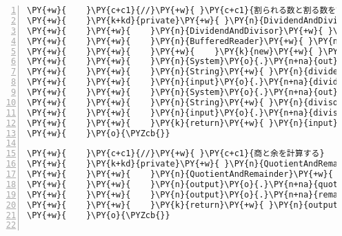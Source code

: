 \begin{Verbatim}[commandchars=\\\{\},numbers=left,firstnumber=1,stepnumber=1,frame=single,fontsize=\small]
\PY{+w}{    }\PY{c+c1}{//}\PY{+w}{ }\PY{c+c1}{割られる数と割る数を読み込む}
\PY{+w}{    }\PY{k+kd}{private}\PY{+w}{ }\PY{n}{DividendAndDivisor}\PY{+w}{ }\PY{n+nf}{input}\PY{o}{(}\PY{o}{)}\PY{+w}{ }\PY{k+kd}{throws}\PY{+w}{ }\PY{n}{IOException}\PY{+w}{ }\PY{o}{\PYZob{}}
\PY{+w}{    }\PY{+w}{    }\PY{n}{DividendAndDivisor}\PY{+w}{ }\PY{n}{input}\PY{+w}{ }\PY{o}{=}\PY{+w}{ }\PY{k}{new}\PY{+w}{ }\PY{n}{DividendAndDivisor}\PY{o}{(}\PY{o}{)}\PY{o}{;}
\PY{+w}{    }\PY{+w}{    }\PY{n}{BufferedReader}\PY{+w}{ }\PY{n}{reader}\PY{+w}{ }\PY{o}{=}
\PY{+w}{    }\PY{+w}{    }\PY{+w}{    }\PY{k}{new}\PY{+w}{ }\PY{n+nf}{BufferedReader}\PY{o}{(}\PY{k}{new}\PY{+w}{ }\PY{n}{InputStreamReader}\PY{o}{(}\PY{n}{System}\PY{o}{.}\PY{n+na}{in}\PY{o}{)}\PY{o}{)}\PY{o}{;}
\PY{+w}{    }\PY{+w}{    }\PY{n}{System}\PY{o}{.}\PY{n+na}{out}\PY{o}{.}\PY{n+na}{print}\PY{o}{(}\PY{l+s}{"割られる数を入力してください："}\PY{o}{)}\PY{o}{;}
\PY{+w}{    }\PY{+w}{    }\PY{n}{String}\PY{+w}{ }\PY{n}{dividendString}\PY{+w}{ }\PY{o}{=}\PY{+w}{ }\PY{n}{reader}\PY{o}{.}\PY{n+na}{readLine}\PY{o}{(}\PY{o}{)}\PY{o}{;}
\PY{+w}{    }\PY{+w}{    }\PY{n}{input}\PY{o}{.}\PY{n+na}{dividend}\PY{+w}{ }\PY{o}{=}\PY{+w}{ }\PY{n}{Integer}\PY{o}{.}\PY{n+na}{parseInt}\PY{o}{(}\PY{n}{dividendString}\PY{o}{)}\PY{o}{;}
\PY{+w}{    }\PY{+w}{    }\PY{n}{System}\PY{o}{.}\PY{n+na}{out}\PY{o}{.}\PY{n+na}{print}\PY{o}{(}\PY{l+s}{"割る数を入力してください："}\PY{o}{)}\PY{o}{;}
\PY{+w}{    }\PY{+w}{    }\PY{n}{String}\PY{+w}{ }\PY{n}{divisorString}\PY{+w}{ }\PY{o}{=}\PY{+w}{ }\PY{n}{reader}\PY{o}{.}\PY{n+na}{readLine}\PY{o}{(}\PY{o}{)}\PY{o}{;}
\PY{+w}{    }\PY{+w}{    }\PY{n}{input}\PY{o}{.}\PY{n+na}{divisor}\PY{+w}{ }\PY{o}{=}\PY{+w}{ }\PY{n}{Integer}\PY{o}{.}\PY{n+na}{parseInt}\PY{o}{(}\PY{n}{divisorString}\PY{o}{)}\PY{o}{;}
\PY{+w}{    }\PY{+w}{    }\PY{k}{return}\PY{+w}{ }\PY{n}{input}\PY{o}{;}
\PY{+w}{    }\PY{o}{\PYZcb{}}

\PY{+w}{    }\PY{c+c1}{//}\PY{+w}{ }\PY{c+c1}{商と余を計算する}
\PY{+w}{    }\PY{k+kd}{private}\PY{+w}{ }\PY{n}{QuotientAndRemainder}\PY{+w}{ }\PY{n+nf}{process}\PY{o}{(}\PY{n}{DividendAndDivisor}\PY{+w}{ }\PY{n}{input}\PY{o}{)}\PY{+w}{ }\PY{o}{\PYZob{}}
\PY{+w}{    }\PY{+w}{    }\PY{n}{QuotientAndRemainder}\PY{+w}{ }\PY{n}{output}\PY{+w}{ }\PY{o}{=}\PY{+w}{ }\PY{k}{new}\PY{+w}{ }\PY{n}{QuotientAndRemainder}\PY{o}{(}\PY{o}{)}\PY{o}{;}
\PY{+w}{    }\PY{+w}{    }\PY{n}{output}\PY{o}{.}\PY{n+na}{quotient}\PY{+w}{ }\PY{o}{=}\PY{+w}{ }\PY{n}{input}\PY{o}{.}\PY{n+na}{dividend}\PY{+w}{ }\PY{o}{/}\PY{+w}{ }\PY{n}{input}\PY{o}{.}\PY{n+na}{divisor}\PY{o}{;}
\PY{+w}{    }\PY{+w}{    }\PY{n}{output}\PY{o}{.}\PY{n+na}{remainder}\PY{+w}{ }\PY{o}{=}\PY{+w}{ }\PY{n}{input}\PY{o}{.}\PY{n+na}{dividend}\PY{+w}{ }\PY{o}{\PYZpc{}}\PY{+w}{ }\PY{n}{input}\PY{o}{.}\PY{n+na}{divisor}\PY{o}{;}
\PY{+w}{    }\PY{+w}{    }\PY{k}{return}\PY{+w}{ }\PY{n}{output}\PY{o}{;}
\PY{+w}{    }\PY{o}{\PYZcb{}}


\end{Verbatim}
